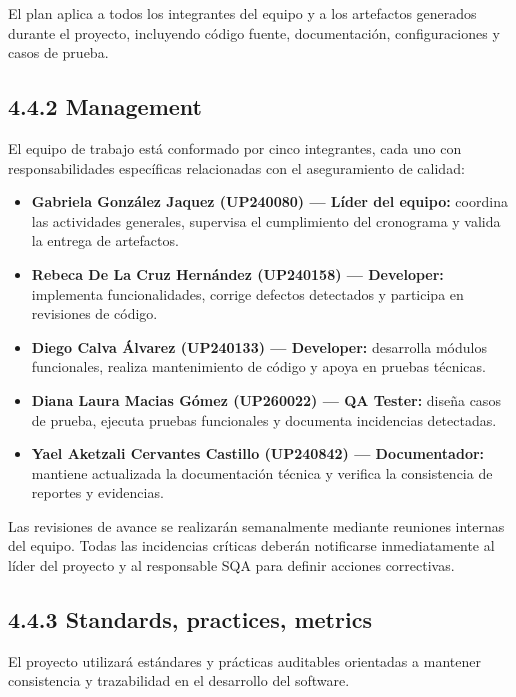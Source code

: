 \documentclass[12pt,a4paper]{article}
\begin{document}
El plan aplica a todos los integrantes del equipo y a los artefactos generados durante el proyecto, incluyendo código fuente, documentación, configuraciones y casos de prueba.

\subsection{4.4.2 Management}

El equipo de trabajo está conformado por cinco integrantes, cada uno con responsabilidades específicas relacionadas con el aseguramiento de calidad:

\begin{itemize}
    \item \textbf{Gabriela González Jaquez (UP240080) --- Líder del equipo:} coordina las actividades generales, supervisa el cumplimiento del cronograma y valida la entrega de artefactos.
    
    \item \textbf{Rebeca De La Cruz Hernández (UP240158) --- Developer:} implementa funcionalidades, corrige defectos detectados y participa en revisiones de código.
    
    \item \textbf{Diego Calva Álvarez (UP240133) --- Developer:} desarrolla módulos funcionales, realiza mantenimiento de código y apoya en pruebas técnicas.
    
    \item \textbf{Diana Laura Macias Gómez (UP260022) --- QA Tester:} diseña casos de prueba, ejecuta pruebas funcionales y documenta incidencias detectadas.
    
    \item \textbf{Yael Aketzali Cervantes Castillo (UP240842) --- Documentador:} mantiene actualizada la documentación técnica y verifica la consistencia de reportes y evidencias.
\end{itemize}

Las revisiones de avance se realizarán semanalmente mediante reuniones internas del equipo. Todas las incidencias críticas deberán notificarse inmediatamente al líder del proyecto y al responsable SQA para definir acciones correctivas.

\subsection{4.4.3 Standards, practices, metrics}

El proyecto utilizará estándares y prácticas auditables orientadas a mantener consistencia y trazabilidad en el desarrollo del software.
\end{document}
